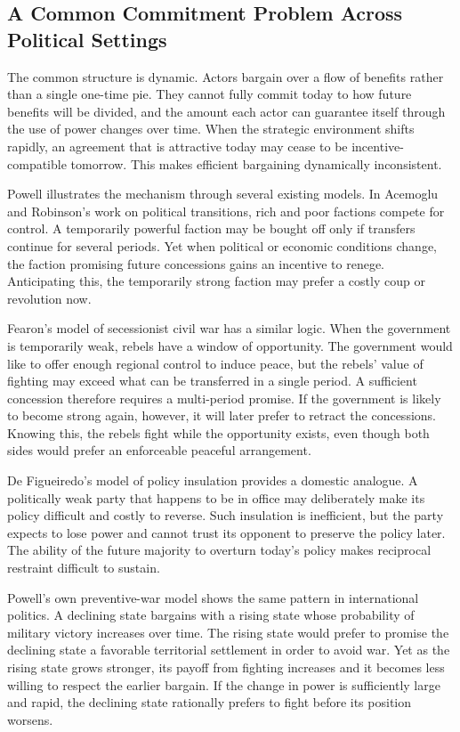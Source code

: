 \subsection{A Common Commitment Problem Across Political Settings}

The common structure is dynamic. Actors bargain over a flow of benefits rather than a single one-time pie. They cannot fully commit today to how future benefits will be divided, and the amount each actor can guarantee itself through the use of power changes over time. When the strategic environment shifts rapidly, an agreement that is attractive today may cease to be incentive-compatible tomorrow. This makes efficient bargaining dynamically inconsistent.

Powell illustrates the mechanism through several existing models. In Acemoglu and Robinson's work on political transitions, rich and poor factions compete for control. A temporarily powerful faction may be bought off only if transfers continue for several periods. Yet when political or economic conditions change, the faction promising future concessions gains an incentive to renege. Anticipating this, the temporarily strong faction may prefer a costly coup or revolution now.

Fearon's model of secessionist civil war has a similar logic. When the government is temporarily weak, rebels have a window of opportunity. The government would like to offer enough regional control to induce peace, but the rebels' value of fighting may exceed what can be transferred in a single period. A sufficient concession therefore requires a multi-period promise. If the government is likely to become strong again, however, it will later prefer to retract the concessions. Knowing this, the rebels fight while the opportunity exists, even though both sides would prefer an enforceable peaceful arrangement.

De Figueiredo's model of policy insulation provides a domestic analogue. A politically weak party that happens to be in office may deliberately make its policy difficult and costly to reverse. Such insulation is inefficient, but the party expects to lose power and cannot trust its opponent to preserve the policy later. The ability of the future majority to overturn today's policy makes reciprocal restraint difficult to sustain.

Powell's own preventive-war model shows the same pattern in international politics. A declining state bargains with a rising state whose probability of military victory increases over time. The rising state would prefer to promise the declining state a favorable territorial settlement in order to avoid war. Yet as the rising state grows stronger, its payoff from fighting increases and it becomes less willing to respect the earlier bargain. If the change in power is sufficiently large and rapid, the declining state rationally prefers to fight before its position worsens.

